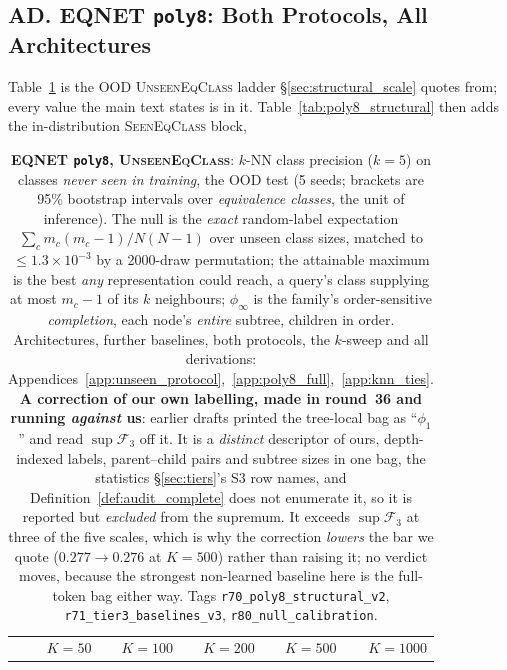 \subsection*{AD. EQNET \texttt{poly8}: Both Protocols, All Architectures}

Table~\ref{tab:poly8_unseen} is the OOD \textsc{UnseenEqClass} ladder \S\ref{sec:structural_scale} quotes from; every value the main text states is in it. Table~\ref{tab:poly8_structural} then adds the in-distribution \textsc{SeenEqClass} block,

\begin{table}[h]
\centering
\begin{threeparttable}
\footnotesize
\caption{\textbf{EQNET \texttt{poly8}, \textsc{UnseenEqClass}}: $k$-NN class precision ($k{=}5$) on classes \emph{never seen in training}, the OOD test (5 seeds; brackets are 95\% bootstrap intervals over \emph{equivalence classes}, the unit of inference). The null is the \emph{exact} random-label expectation $\sum_c m_c(m_c{-}1)/N(N{-}1)$ over unseen class sizes, matched to ${\leq}1.3{\times}10^{-3}$ by a 2000-draw permutation; the attainable maximum is the best \emph{any} representation could reach, a query's class supplying at most $m_c{-}1$ of its $k$ neighbours; $\phi_\infty$ is the family's order-sensitive \emph{completion}, each node's \emph{entire} subtree, children in order. Architectures, further baselines, both protocols, the $k$-sweep and all derivations: Appendices~\ref{app:unseen_protocol},~\ref{app:poly8_full},~\ref{app:knn_ties}. \textbf{A correction of our own labelling, made in round~36 and running \emph{against} us}: earlier drafts printed the tree-local bag as ``$\phi_1$'' and read $\sup\mathcal{F}_3$ off it. It is a \emph{distinct} descriptor of ours, depth-indexed labels, parent--child pairs and subtree sizes in one bag, the statistics \S\ref{sec:tiers}'s S3 row names, and Definition~\ref{def:audit_complete} does not enumerate it, so it is reported but \emph{excluded} from the supremum. It exceeds $\sup\mathcal{F}_3$ at three of the five scales, which is why the correction \emph{lowers} the bar we quote ($0.277\to0.276$ at $K{=}500$) rather than raising it; no verdict moves, because the strongest non-learned baseline here is the full-token bag either way. Tags \texttt{r70\_poly8\_structural\_v2}, \texttt{r71\_tier3\_baselines\_v3}, \texttt{r80\_null\_calibration}.}
\label{tab:poly8_unseen}
\small
\begin{tabular}{l rrrrr}
\toprule
 & $K{=}50$ & $K{=}100$ & $K{=}200$ & $K{=}500$ & $K{=}1000$ \\

\end{tabular}
\end{threeparttable}
\end{table}
